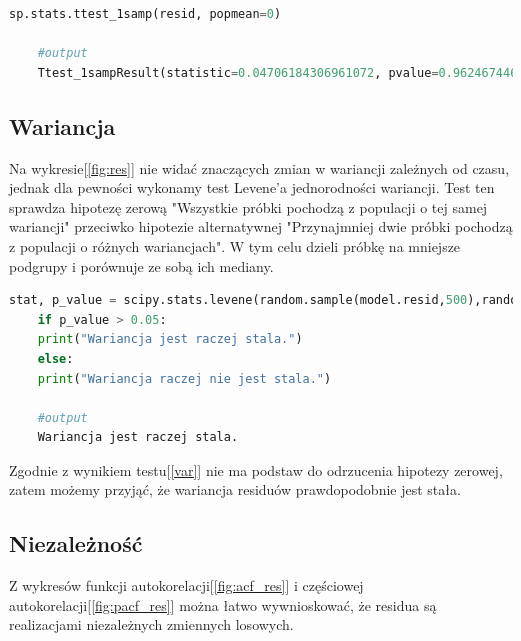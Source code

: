 \documentclass{article}
\theoremstyle{break}
\begin{document}
\begin{lstlisting}[language=Python, caption=Test t, label={srednia}]
	sp.stats.ttest_1samp(resid, popmean=0)
	
	#output
	Ttest_1sampResult(statistic=0.04706184306961072, pvalue=0.9624674462497231)
\end{lstlisting}

\subsection{Wariancja}
Na wykresie[\ref{fig:res}] nie widać znaczących zmian w wariancji zależnych od czasu, jednak dla pewności wykonamy test Levene'a jednorodności wariancji. Test ten sprawdza hipotezę zerową "Wszystkie próbki pochodzą z populacji o tej samej wariancji" przeciwko hipotezie alternatywnej "Przynajmniej dwie próbki pochodzą z populacji o różnych wariancjach". W tym celu dzieli próbkę na mniejsze podgrupy i porównuje ze sobą ich mediany.

\begin{lstlisting}[language=Python, caption=Test Levene'a, label={var}]
	stat, p_value = scipy.stats.levene(random.sample(model.resid,500),random.sample(model.resid,500))
	if p_value > 0.05:
	print("Wariancja jest raczej stala.")
	else:
	print("Wariancja raczej nie jest stala.")
	
	#output
	Wariancja jest raczej stala.
\end{lstlisting}

Zgodnie z wynikiem testu[\ref{var}] nie ma podstaw do odrzucenia hipotezy zerowej, zatem możemy przyjąć, że wariancja residuów prawdopodobnie jest stała.

\subsection{Niezależność}
Z wykresów funkcji autokorelacji[\ref{fig:acf_res}] i częściowej autokorelacji[\ref{fig:pacf_res}] można łatwo wywnioskować, że residua są realizacjami niezależnych zmiennych losowych.
\end{document}

